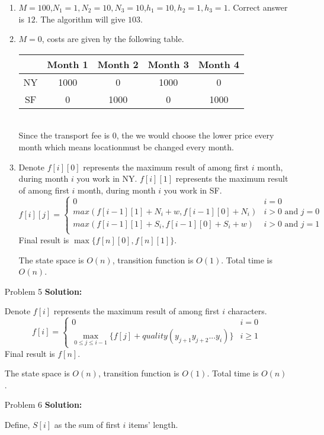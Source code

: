 \normalfont\documentclass[letterpaper,11pt]{article}
\begin{document}
\begin{enumerate}
\begin{enumerate}
		\item $M = 100$,$N_1 = 1, N_2 = 10, N_3 = 10$,$h_1 = 10, h_2 = 1, h_3 = 1$.
		Correct answer is $12$. The algorithm will give $103$.
		\item  $M = 0$, costs are given by the following table.\\
		\begin{tabular}{|c|c|c|c|c|}
			\hline
			&Month 1& Month 2 & Month 3 & Month 4   \\
			\hline
			NY & 1000 & 0 & 1000 & 0 \\
			\hline
			SF & 0 & 1000 & 0 & 1000 \\
			\hline
		\end{tabular}\\
		Since the transport fee is 0, the we would choose the lower price every month which means locationmust be changed every month.
		\item Denote $f[i][0]$ represents the maximum result of among first $i$ month, during month $i$ you work in NY. $f[i][1]$ represents the maximum result of among first $i$ month, during month $i$ you work in SF.
		$$ f[i][j]=\left\{
			\begin{array}{ll}
			0   &    i = 0\\
			max(f[i-1][1] + N_i + w, f[i-1][0] + N_i) &           i > 0 \text{ and } j = 0\\
			max(f[i-1][1] + S_i, f[i-1][0] + S_i + w)  &          i > 0 \text{ and } j = 1\\
			\end{array} \right. 
		$$
		Final result is $\max\{f[n][0],f[n][1]\}$.\par
		The state space is $O(n)$, transition function is $O(1)$. Total time is $O(n)$.
	\end{enumerate}
\item [Problem 5]\textbf{Solution:}\par
Denote $f[i]$ represents the maximum result of among first $i$ characters.
	$$ f[i]=\left\{
		\begin{array}{ll}
		0   &    i = 0\\
		\max \limits_{0 \le j \le i -1}\{f[j] + quality(y_{j+1}y_{j+2}...y_i)\} &           i \ge 1
		\end{array} \right. 
	$$
	Final result is $f[n]$.\par
	The state space is $O(n)$, transition function is $O(1)$. Total time is $O(n)$.
\item [Problem 6]\textbf{Solution:}\par
	Define, $S[i]$ as the sum of first $i$ items' length.

\end{enumerate}
\end{document}
